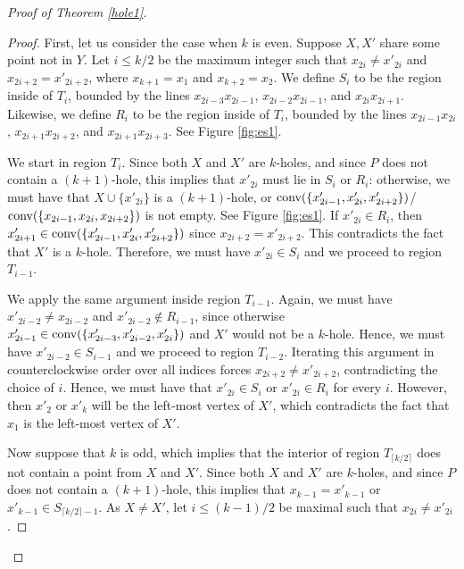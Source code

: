 \documentclass[11pt]{article}
\theoremstyle{plain}
\theoremstyle{definition}
\theoremstyle{remark}
\def\conv{\mbox{\rm conv}}
\begin{document}
\begin{proof}[Proof of Theorem \ref{hole1}]
\begin{proof}
  First, let us consider the case when $k$ is even.  Suppose $X,X'$ share some point not in $Y$.  Let $i\leq k/2$ be the maximum integer such that $x_{2i} \neq x'_{2i}$ and $x_{2i + 2} = x'_{2i+2}$, where $x_{k + 1} = x_1$ and $x_{k + 2} = x_2$.  We define $S_i$ to be the region inside of $T_i$, bounded by the lines $x_{2i-3}x_{2i-1}$, $x_{2i-2}x_{2i-1}$, and $x_{2i}x_{2i+1}$.   Likewise, we define $R_i$ to be the region inside of $T_i$, bounded by the lines $x_{2i-1}x_{2i}$, $x_{2i+1}x_{2i+2}$, and $x_{2i + 1}x_{2i+3}$.  See Figure \ref{fig:es1}.    





We start in region $T_i$.  Since both $X$ and $X'$ are $k$-holes, and since $P$ does not contain a $(k + 1)$-hole, this implies that $x'_{2i}$ must lie in $S_i$ or $R_i$: otherwise, we must have that $X\cup \{x'_{2i}\}$ is a $(k+1)$-hole, or $\conv(\{x'_{2i - 1},x'_{2i},x'_{2i + 2}\})$/$\conv(\{x_{2i - 1},x_{2i},x_{2i + 2}\})$ is not empty.  See Figure \ref{fig:es1}.  If $x'_{2i} \in R_i$, then $x'_{2i + 1} \in \conv(\{x'_{2i - 1},x'_{2i},x'_{2i + 2}\})$ since $x_{2i + 2} = x'_{2i+2}$.  This contradicts the fact that $X'$ is a $k$-hole.  Therefore, we must have $x'_{2i} \in S_i$ and we proceed to region $T_{i-1}$.  

We apply the same argument inside region $T_{i-1}$.  Again, we must have $x'_{2i - 2} \neq x_{2i - 2}$ and $x'_{2i - 2}  \notin R_{i-1}$, since otherwise $x'_{2i - 1} \in \conv(\{x'_{2i - 3},x'_{2i-2},x'_{2i}\})$ and $X'$ would not be a $k$-hole.  Hence, we must have $x'_{2i-2} \in S_{i-1}$ and we proceed to region $T_{i-2}$.  Iterating this argument in counterclockwise order over all indices forces $x_{2i+2} \neq x'_{2i+2}$, contradicting the choice of $i$. Hence, we must have that $x'_{2i}\in S_i$ or $x'_{2i}\in R_i$ for every $i$. However, then $x'_2$ or $x'_{k}$ will be the left-most vertex of $X'$, which contradicts the fact that $x_1$ is the left-most vertex of $X'$. 

\medskip


Now suppose that $k$ is odd, which implies that the interior of region $T_{\lceil k/2\rceil}$ does not contain a point from $X$ and $X'$. Since both $X$ and $X'$ are $k$-holes, and since $P$ does not contain a $(k + 1)$-hole, this implies that $x_{k-1}=x'_{k-1}$ or $x'_{k-1} \in S_{\lceil k/2\rceil-1}$. As $X\neq X'$, let $i\leq (k-1)/2$ be maximal such that $x_{2i} \neq x'_{2i}$. 






\end{proof}
\end{proof}
\end{document}
